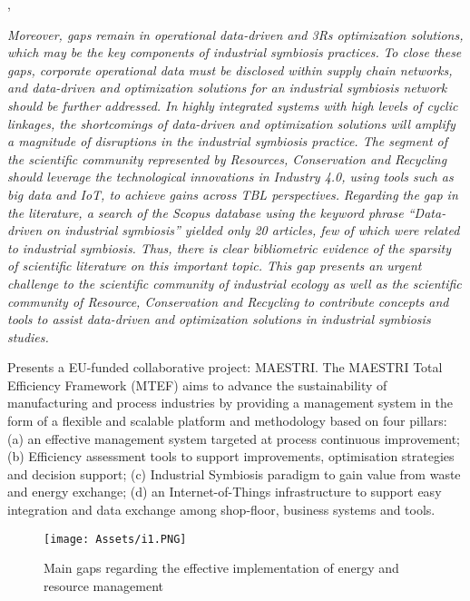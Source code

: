 \textbf{}\par
\textcite{Tseng2018}, 

\textit{Moreover, gaps remain in operational data-driven and 3Rs optimization solutions, which may be the key components of industrial symbiosis practices.}
\textit{To close these gaps, corporate operational data must be disclosed within supply chain networks, and data-driven and optimization solutions for an industrial symbiosis network should be further addressed. In highly integrated systems with high levels of cyclic linkages, the shortcomings of data-driven and optimization solutions will amplify a magnitude of disruptions in the industrial symbiosis practice. The segment of the scientific community represented by Resources, Conservation and Recycling should leverage the technological innovations in Industry 4.0, using tools such as big data and IoT, to achieve gains across TBL perspectives.}
\textit{Regarding the gap in the literature, a search of the Scopus database using the keyword phrase “Data-driven on industrial symbiosis” yielded only 20 articles, few of which were related to industrial symbiosis. Thus, there is clear bibliometric evidence of the sparsity of scientific literature on this important topic. This gap presents an urgent challenge to the scientific community of industrial ecology as well as the scientific community of Resource, Conservation and Recycling to contribute concepts and tools to assist data-driven and optimization solutions in industrial symbiosis studies.}


\textbf{}\par
\textcite{Ferrera2017}

Presents a EU-funded collaborative project: MAESTRI. The MAESTRI Total Efficiency Framework (MTEF) aims to advance the sustainability of manufacturing and process industries by providing a management system in the form of a flexible and scalable platform and methodology based on four pillars: (a) an effective management system targeted at process continuous improvement; (b) Efficiency assessment tools to support improvements, optimisation strategies and decision support; (c) Industrial Symbiosis paradigm to gain value from waste and energy exchange; (d) an Internet-of-Things infrastructure to support easy integration and data exchange among shop-floor, business systems and tools.\par


\begin{figure}[h!]
    \centering
    \texttt{[image: Assets/i1.PNG]}
    \caption{Main gaps regarding the effective implementation of energy and resource management}
    \label{fig:mgmt_gaps}
\end{figure}



